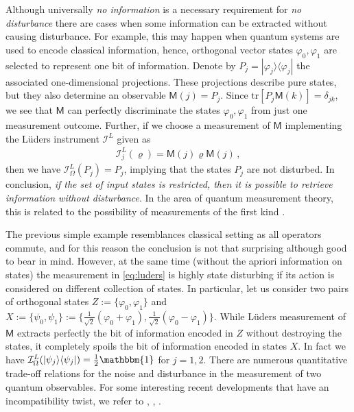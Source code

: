\documentclass[12pt]{article}
\theoremstyle{definition}
\newcommand{\kb}[2]{|#1\rangle\langle#2|} %
\newcommand{\tr}[1]{\textrm{tr}\left[#1\right]} %
\newcommand{\id}{\mathbbm{1}} %
\newcommand{\Mo}{\mathsf{M}}%
\newcommand{\Ii}{\mathcal{I}}
\begin{document}
{Although universally \emph{no information} is a necessary requirement 
for \emph{no disturbance} there are cases when some information can be extracted
without causing disturbance. For example, this may happen when quantum 
systems are used to encode classical information, hence, orthogonal vector 
states $\varphi_0, \varphi_1$ are selected to represent one bit of information.  
Denote by $P_j = \kb{\varphi_j}{\varphi_j}$ the associated one-dimensional projections. These projections describe pure states, but they also determine an observable $\Mo(j)=P_j$. Since $\tr{P_j\Mo(k)}=\delta_{jk}$, we see that  $\Mo$ can perfectly discriminate the states $\varphi_0,\varphi_1$ from just one measurement outcome. Further, if we choose a measurement of $\Mo$ implementing the L\"uders instrument $\Ii^L$ given as
\begin{align}\label{eq:luders}
\Ii^L_j(\varrho) = \Mo(j)\varrho \Mo(j) \, , 
\end{align}
then we have $\Ii^L_\Omega(P_j) = P_j$, implying that the 
states $P_j$ are not disturbed. In conclusion, \emph{if the set of input 
states is restricted, then it is possible to retrieve information 
without disturbance}. 
In the area of quantum measurement theory, this is related to the possibility of measurements of the first kind \cite{BuCaLa90}.

The previous simple example resemblances classical setting as all operators commute, and for this reason the conclusion is not that surprising although good to bear in mind. However, at the same time (without the apriori information on states) the measurement in \eqref{eq:luders} is highly state disturbing if its action is considered on different collection of states. In particular, let us consider two pairs of orthogonal states $Z:= \{ \varphi_0, \varphi_1\}$ and 
$X:= \{ \psi_0, \psi_1\}:= \{\frac{1}{\sqrt{2}}(\varphi_0 + \varphi_1), 
\frac{1}{\sqrt{2}}(\varphi_0 - \varphi_1)\}$. 
While L\"uders measurement of $\Mo$ extracts perfectly   
the bit of information encoded in $Z$ without destroying the states, 
it completely spoils the bit of information encoded in states 
$X$. 
In fact we have  $\Ii^L_{\Omega} ( |\psi_j \rangle \langle \psi_j|) 
= \frac{1}{2}\id$ for $j=1,2$.
There are numerous quantitative trade-off relations for the noise and disturbance in the measurement of two quantum observables. 
For some interesting recent developments that have an incompatibility twist, we refer to \cite{BuHaOzWi14}, \cite{MaSr14a}, \cite{ReSc14}. 

}
\end{document}
